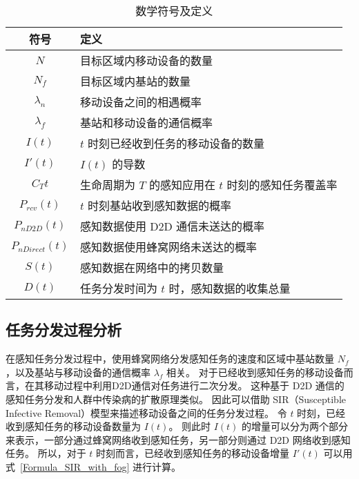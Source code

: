 \begin{table}[h]
  \caption{数学符号及定义}
  \vspace{-0.5em}
  \centering
  \label{table_notations_UIC}
  \begin{tabular}{|c|p{9.5cm}|}
  \hline
  \textbf{符号} & \textbf{定义}\\
  \hline
  $N$ & 目标区域内移动设备的数量\\\hline
  $N_f$ & 目标区域内基站的数量\\\hline
  $\lambda_n$ & 移动设备之间的相遇概率\\\hline
  $\lambda_f$ & 基站和移动设备的通信概率\\\hline
  $I(t)$ & $t$ 时刻已经收到任务的移动设备的数量\\\hline
  $I'(t)$ & $I(t)$ 的导数\\\hline
  $C_T{t}$ & 生命周期为 $T$ 的感知应用在 $t$ 时刻的感知任务覆盖率\\\hline
  $P_{rcv}(t)$ & $t$ 时刻基站收到感知数据的概率\\\hline
  $P_{nD2D}(t)$ & 感知数据使用 D2D 通信未送达的概率\\\hline
  $P_{nDirect}(t)$ & 感知数据使用蜂窝网络未送达的概率\\\hline
  $S(t)$ & 感知数据在网络中的拷贝数量\\\hline
  $D(t)$ & 任务分发时间为 $t$ 时，感知数据的收集总量\\\hline
\end{tabular}
\end{table}

\subsection{任务分发过程分析}

在感知任务分发过程中，使用蜂窝网络分发感知任务的速度和区域中基站数量 $N_f$，以及基站与移动设备的通信概率 $\lambda_f$ 相关。
对于已经收到感知任务的移动设备而言，在其移动过程中利用D2D通信对任务进行二次分发。
这种基于 D2D 通信的感知任务分发和人群中传染病的扩散原理类似。
因此可以借助 SIR（Susceptible Infective Removal）模型来描述移动设备之间的任务分发过程。
令 $t$ 时刻，已经收到感知任务的移动设备数量为 $I(t)$。
则此时 $I(t)$ 的增量可以分为两个部分来表示，一部分通过蜂窝网络收到感知任务，另一部分则通过 D2D 网络收到感知任务。
所以，对于 $t$ 时刻而言，已经收到感知任务的移动设备增量 $I'(t)$ 可以用式~\eqref{Formula_SIR_with_fog} 进行计算。

